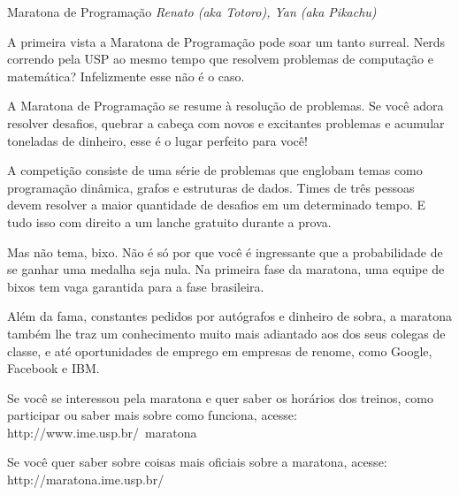 \begin{secao}{Maratona de Programação}
{\em Renato (aka Totoro), Yan (aka Pikachu)} %

A primeira vista a Maratona de Programação pode soar um tanto
surreal. Nerds correndo pela USP ao mesmo tempo que resolvem
problemas de computação e matemática? Infelizmente esse não
é o caso.

A Maratona de Programação se resume à resolução de problemas.
Se você adora resolver desafios, quebrar a cabeça com novos
e excitantes problemas e acumular toneladas de dinheiro, esse
é o lugar perfeito para você!

A competição consiste de uma série de problemas que englobam
temas como programação dinâmica, grafos e estruturas de dados.
Times de três pessoas devem resolver a maior quantidade de
desafios em um determinado tempo. E tudo isso com direito
a um lanche gratuito durante a prova.

Mas não tema, bixo. Não é só por que você é ingressante que
a probabilidade de se ganhar uma medalha seja nula. Na primeira 
fase da maratona, uma equipe de bixos tem vaga garantida para a 
fase brasileira.

Além da fama, constantes pedidos por autógrafos e dinheiro de sobra,
a maratona também lhe traz um conhecimento muito mais 
adiantado aos dos seus colegas de classe, e até oportunidades
de emprego em empresas de renome, como Google, Facebook e IBM.

Se você se interessou pela maratona e quer saber os horários dos
treinos, como participar ou saber mais sobre como funciona, acesse:
http://www.ime.usp.br/~maratona

Se você quer saber sobre coisas mais oficiais sobre a maratona, acesse:
http://maratona.ime.usp.br/

\end{secao}
